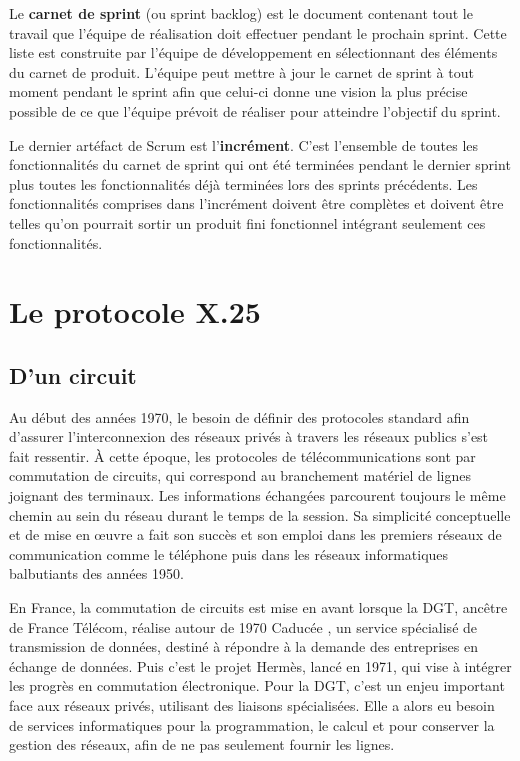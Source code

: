 \documentclass[12pt]{report}
\begin{document}
Le \textbf{carnet de sprint} (ou sprint backlog) est le document contenant tout le travail que l'équipe de réalisation doit effectuer pendant le prochain sprint.
Cette liste est construite par l'équipe de développement en sélectionnant des éléments du carnet de produit. L'équipe peut mettre à jour le carnet de sprint à tout moment pendant le sprint afin que celui-ci donne une vision la plus précise possible de ce que l'équipe prévoit de réaliser pour atteindre l'objectif du sprint.

Le dernier artéfact de Scrum est l'\textbf{incrément}. C'est l'ensemble de toutes les fonctionnalités du carnet de sprint qui ont été terminées pendant le dernier sprint plus toutes les fonctionnalités déjà terminées lors des sprints précédents. Les fonctionnalités comprises dans l'incrément doivent être complètes et doivent être telles qu'on pourrait sortir un produit fini fonctionnel intégrant seulement ces fonctionnalités.

\chapter{Le protocole X.25}

\section{D'un circuit}

Au début des années 1970, le besoin de définir des protocoles standard afin d'assurer l'interconnexion des réseaux privés à travers les réseaux publics s'est fait ressentir.
À cette époque, les protocoles de télécommunications sont par commutation de circuits, qui correspond au branchement matériel de lignes joignant des terminaux. Les informations échangées parcourent toujours le même chemin au sein du réseau durant le temps de la session. Sa simplicité conceptuelle et de mise en œuvre a fait son succès et son emploi dans les premiers réseaux de communication comme le téléphone puis dans les réseaux informatiques balbutiants des années 1950\cite{wikicc}.

En France, la commutation de circuits est mise en avant lorsque la \gls{DGT}, ancêtre de France Télécom, réalise autour de 1970 \og Caducée \fg, un service spécialisé de transmission de données, destiné à répondre à la demande des entreprises en échange de données. Puis c'est le projet Hermès, lancé en 1971, qui vise à intégrer les progrès en commutation électronique. Pour la DGT, c'est un enjeu important face aux réseaux privés, utilisant des liaisons spécialisées. Elle a alors eu besoin de services informatiques pour la programmation, le calcul et pour conserver la gestion des réseaux, afin de ne pas seulement fournir les lignes.
\end{document}
